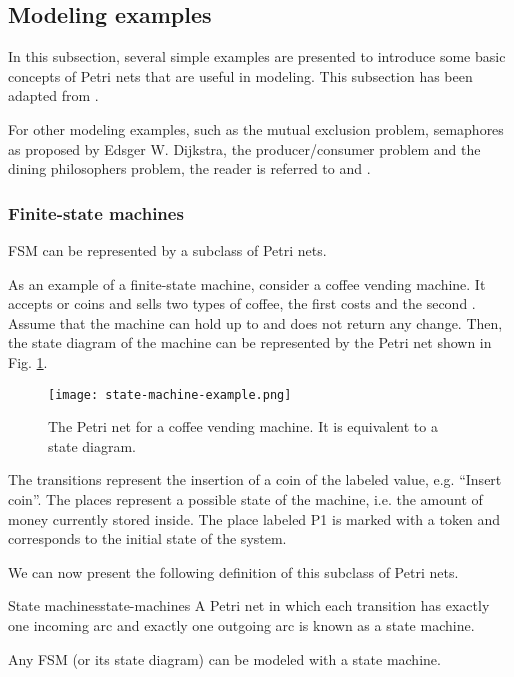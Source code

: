 \documentclass[../Thesis.tex]{subfiles}
\begin{document}
\subsection{Modeling examples}

In this subsection, several simple examples are presented to introduce
some basic concepts of Petri nets that are useful in modeling.
This subsection has been adapted from \cite{murata1989}.

For other modeling examples, such as the mutual exclusion problem,
semaphores as proposed by Edsger W. Dijkstra, the producer/consumer problem
and the dining philosophers problem, the reader is referred to
\cite[Chapter 3]{peterson1981} and \cite{reisig2013}.

\subsubsection{Finite-state machines}

\acrfull{FSM} can be represented by a subclass of Petri nets.

As an example of a finite-state machine, consider a coffee vending machine.
It accepts  or  coins and sells two types of coffee,
the first costs  and the second .
Assume that the machine can hold up to  and does not return any change.
Then, the state diagram of the machine can be represented
by the Petri net shown in Fig. \ref{fig:state-machine-example}.

\begin{figure}[H]
    \centering
    \texttt{[image: state-machine-example.png]}
    \caption{The Petri net for a coffee vending machine.
        It is equivalent to a state diagram.}
    \label{fig:state-machine-example}
\end{figure}

The transitions represent the insertion of a coin of the labeled value,
e.g. ``Insert  coin''.
The places represent a possible state of the machine,
i.e. the amount of money currently stored inside.
The place labeled \uppercase{P1} is marked with a token
and corresponds to the initial state of the system.

We can now present the following definition of this subclass of Petri nets.

\begin{definition}{State machines}{state-machines}
    A Petri net in which each transition has exactly one incoming arc
    and exactly one outgoing arc is known as a state machine.

    Any \acrshort{FSM} (or its state diagram) can be modeled with a state machine.
\end{definition}
\end{document}
